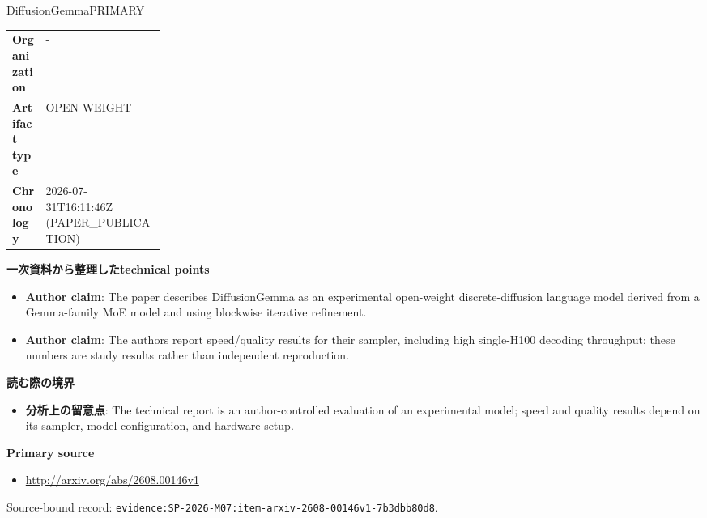 \begin{technicalnote}{DiffusionGemma}{PRIMARY}
\begin{tabularx}{\linewidth}{@{}>{\bfseries}p{0.22\linewidth}X@{}}
Organization & - \\
Artifact type & OPEN WEIGHT \\
Chronology & 2026-07-31T16:11:46Z (PAPER\_PUBLICATION) \\
\end{tabularx}
\smallskip
{\bfseries 一次資料から整理したtechnical points}
\begin{itemize}[leftmargin=1.5em,itemsep=0.35em]
\item \textbf{Author claim}: The paper describes DiffusionGemma as an experimental open-weight discrete-diffusion language model derived from a Gemma-family MoE model and using blockwise iterative refinement.
\item \textbf{Author claim}: The authors report speed/quality results for their sampler, including high single-H100 decoding throughput; these numbers are study results rather than independent reproduction.
\end{itemize}
{\bfseries 読む際の境界}
\begin{itemize}[leftmargin=1.5em,itemsep=0.35em]
\item \textbf{分析上の留意点}: The technical report is an author-controlled evaluation of an experimental model; speed and quality results depend on its sampler, model configuration, and hardware setup.
\end{itemize}
{\bfseries Primary source}
\begingroup\sloppy
\begin{itemize}[leftmargin=1.5em,itemsep=0.25em]
\item {\scriptsize\url{http://arxiv.org/abs/2608.00146v1}}
\end{itemize}
\endgroup
{\scriptsize\color{SurveyMuted}Source-bound record: \texttt{evidence:SP-2026-M07:item-arxiv-2608-00146v1-7b3dbb80d8}.}
\end{technicalnote}
\medskip
